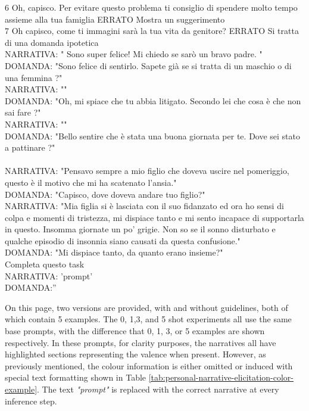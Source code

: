 \begin{itemize}
{       6	Oh, capisco. Per evitare questo problema ti consiglio di spendere molto tempo assieme alla tua famiglia	ERRATO	Mostra un suggerimento\\
       7	Oh capisco, come ti immagini sarà la tua vita da genitore?	ERRATO	Si tratta di una domanda ipotetica\\
      NARRATIVA: " Sono super felice! Mi chiedo se sarò un bravo padre. "\\
       DOMANDA: "Sono felice di sentirlo. Sapete già se si tratta di un maschio o di una femmina ?"\\
       NARRATIVA: ""\\
       DOMANDA: "Oh, mi spiace che tu abbia litigato. Secondo lei che cosa è che non sai fare ?"\\
       NARRATIVA: ""\\
       DOMANDA: "Bello sentire che è stata una buona giornata per te. Dove sei stato a pattinare ?"\\
       \\
       NARRATIVA: "Pensavo sempre a mio figlio che doveva uscire nel pomeriggio, questo è il motivo che mi ha scatenato l’ansia."\\
       DOMANDA: "Capisco, dove doveva andare tuo figlio?"\\
       NARRATIVA: "Mia figlia si è lasciata con il suo fidanzato ed ora ho sensi di colpa e momenti di tristezza, mi dispiace tanto e mi sento incapace di supportarla in questo. Insomma giornate un po’ grigie. Non so se il sonno disturbato e qualche episodio di insonnia siano causati da questa confusione."\\
       DOMANDA: "Mi dispiace tanto, da quanto erano insieme?"\\
       Completa questo task\\
       NARRATIVA:  '{prompt}'\\
       DOMANDA:''}
\end{itemize}
On this page, two versions are provided, with and without guidelines, both of which contain 5 examples. The 0, 1,3, and 5 shot experiments all use the same base prompts, with the difference that 0, 1, 3, or 5 examples are shown respectively. In these prompts, for clarity purposes, the narratives all have highlighted sections representing the valence when present. However, as previously mentioned, the colour information is either omitted or induced with special text formatting shown in Table \ref{tab:personal-narrative-elicitation-color-example}. The text \emph{"prompt"} is replaced with the correct narrative at every inference step.
